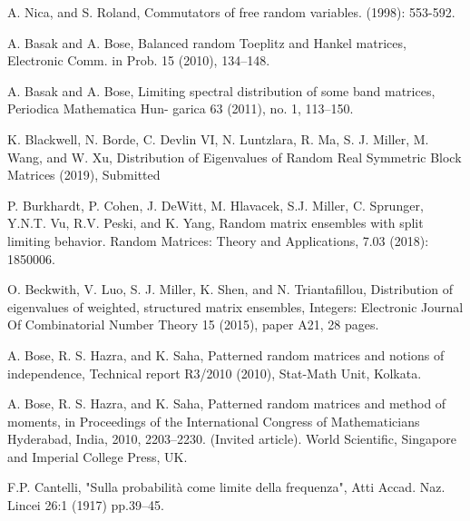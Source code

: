 \documentclass[11pt,reqno]{amsart}
\numberwithin{equation}{section}
\theoremstyle{plain}
\begin{document}
\begin{thebibliography}{BCDHMSTPY} %


A. Nica, and S. Roland, Commutators of free random variables. (1998): 553-592.

A. Basak and A. Bose, Balanced random Toeplitz and Hankel matrices, Electronic Comm. in Prob. 15 (2010), 134–148.

A. Basak and A. Bose, Limiting spectral distribution of some band matrices, Periodica Mathematica Hun- garica 63 (2011), no. 1, 113–150.

K. Blackwell, N. Borde, C. Devlin VI, N. Luntzlara, R. Ma, S. J. Miller, M. Wang, and W. Xu, Distribution of Eigenvalues of Random Real Symmetric Block Matrices (2019), Submitted

P. Burkhardt, P. Cohen, J. DeWitt, M. Hlavacek, S.J. Miller, C. Sprunger, Y.N.T. Vu, R.V. Peski, and K. Yang, Random matrix ensembles with split limiting behavior. Random Matrices: Theory and Applications, 7.03 (2018): 1850006.

O. Beckwith, V. Luo, S. J. Miller, K. Shen, and N. Triantafillou, Distribution of eigenvalues of weighted, structured matrix ensembles, Integers: Electronic Journal Of Combinatorial Number Theory 15 (2015), paper A21, 28 pages.

A. Bose, R. S. Hazra, and K. Saha, Patterned random matrices and notions of independence, Technical report R3/2010 (2010), Stat-Math Unit, Kolkata.

A. Bose, R. S. Hazra, and K. Saha, Patterned random matrices and method of moments, in Proceedings of the International Congress of Mathematicians Hyderabad, India, 2010, 2203–2230. (Invited article). World Scientific, Singapore and Imperial College Press, UK.

 F.P. Cantelli, "Sulla probabilità come limite della frequenza", Atti Accad. Naz. Lincei 26:1 (1917) pp.39–45.


\end{thebibliography}
\end{document}
